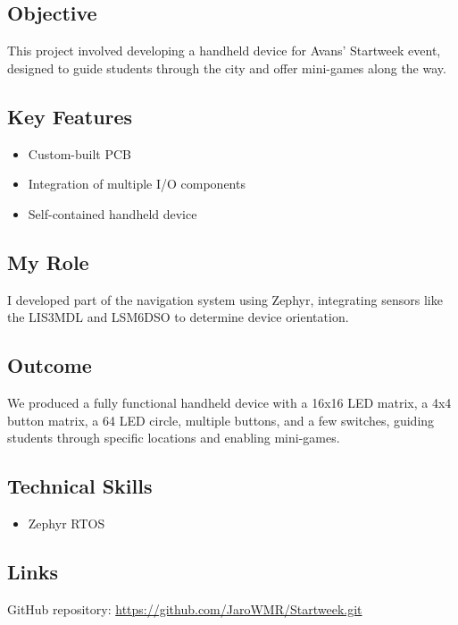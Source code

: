 \documentclass{article}
\begin{document}
\subsection{Objective}
This project involved developing a handheld device for Avans' Startweek event, designed to guide students through the city and offer mini-games along the way.

\subsection{Key Features}
\begin{itemize}
    \item Custom-built PCB
    \item Integration of multiple I/O components
    \item Self-contained handheld device
\end{itemize}

\subsection{My Role}
I developed part of the navigation system using Zephyr, integrating sensors like the LIS3MDL and LSM6DSO to determine device orientation.

\subsection{Outcome}
We produced a fully functional handheld device with a 16x16 LED matrix, a 4x4 button matrix, a 64 LED circle, multiple buttons, and a few switches, guiding students through specific locations and enabling mini-games.

\subsection{Technical Skills}
\begin{itemize}
    \item Zephyr RTOS
\end{itemize}

\subsection{Links}
GitHub repository:
\url{https://github.com/JaroWMR/Startweek.git}
\end{document}
